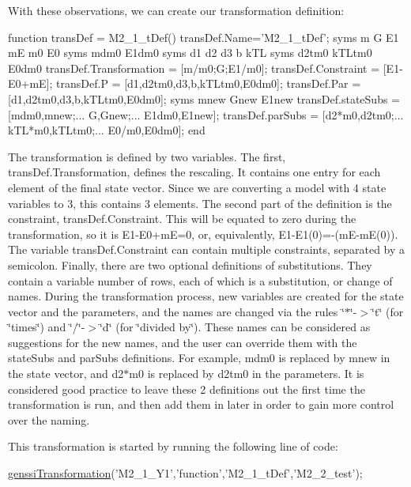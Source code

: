 With these observations, we can create our transformation definition\+:


\begin{DoxyCode}
\textcolor{keyword}{function} transDef = M2\_1\_tDef()
    transDef.Name='M2\_1\_tDef';
    syms m G E1 mE m0 E0
    syms mdm0 E1dm0
    syms d1 d2 d3 b kTL
    syms d2tm0 kTLtm0 E0dm0
    transDef.Transformation = [m/m0;G;E1/m0];
    transDef.Constraint = [E1-E0+mE];
    transDef.P = [d1,d2tm0,d3,b,kTLtm0,E0dm0];
    transDef.Par = [d1,d2tm0,d3,b,kTLtm0,E0dm0];
    syms mnew Gnew E1new
    transDef.stateSubs = [mdm0,mnew;...
                          G,Gnew;...
                          E1dm0,E1new];
    transDef.parSubs = [d2*m0,d2tm0;...
                        kTL*m0,kTLtm0;...
                        E0/m0,E0dm0];
end
\end{DoxyCode}


The transformation is defined by two variables. The first, trans\+Def.\+Transformation, defines the rescaling. It contains one entry for each element of the final state vector. Since we are converting a model with 4 state variables to 3, this contains 3 elements. The second part of the definition is the constraint, trans\+Def.\+Constraint. This will be equated to zero during the transformation, so it is E1-\/\+E0+mE=0, or, equivalently, E1-\/\+E1(0)=-\/(m\+E-\/mE(0)). The variable trans\+Def.\+Constraint can contain multiple constraints, separated by a semicolon. Finally, there are two optional definitions of substitutions. They contain a variable number of rows, each of which is a substitution, or change of names. During the transformation process, new variables are created for the state vector and the parameters, and the names are changed via the rules \char`\"{}$\ast$\char`\"{}-\/$>$\char`\"{}t\char`\"{} (for \char`\"{}times\char`\"{}) and \char`\"{}/\char`\"{}-\/$>$\char`\"{}d\char`\"{} (for \char`\"{}divided by\char`\"{}). These names can be considered as suggestions for the new names, and the user can override them with the state\+Subs and par\+Subs definitions. For example, mdm0 is replaced by mnew in the state vector, and d2$\ast$m0 is replaced by d2tm0 in the parameters. It is considered good practice to leave these 2 definitions out the first time the transformation is run, and then add them in later in order to gain more control over the naming.

This transformation is started by running the following line of code\+:


\begin{DoxyCode}
\hyperlink{genssi_transformation_8m_a00c8981ee764669cf32d736351fbf275}{genssiTransformation}(\textcolor{stringliteral}{'M2\_1\_Y1'},\textcolor{stringliteral}{'function'},\textcolor{stringliteral}{'M2\_1\_tDef'},\textcolor{stringliteral}{'M2\_2\_test'}); 
\end{DoxyCode}


